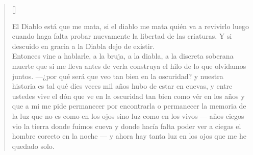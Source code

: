 \documentclass[11pt, a4paper]{article} %
\newcommand{\poemauthorright}[1]{\nopagebreak{\raggedleft\footnotesize\textsc{#1}\par}} %
\begin{document}

\settowidth{\versewidth}{Quiere mi tiempo libre la sutil, flexible dicha de buscarla, ------------------------------------------------------------------} %

\begin{verse}[\versewidth]
{\large

\scriptsize{
El Diablo está que me mata, si el diablo me mata quién va a revivirlo luego cuando
haga falta probar nuevamente la libertad de las criaturas. Y si descuido en gracia a 
la Diabla dejo de existir. \\
Entonces vine a hablarle, a la bruja, a la diabla, a la discreta soberana muerte 
que si me lleva antes de verla construya el hilo de lo que olvidamos juntos. 
---¿por qué será que veo tan bien en la oscuridad? 
y nuestra historia es tal qué dies veces mil años hubo de estar en cuevas, 
y entre ustedes vive el dón que ve en la oscuridad tan bien como vér en los años 
y que a mi me pide permanecer por encontrarla o permanecer la memoria de la luz 
que no es como en los ojos sino luz como en los vivos ---
años ciegos vio la tierra donde fuimos cueva y donde hacía falta 
poder ver a ciegas el hombre corecto en la noche ---
y ahora hay tanta luz en los ojos que me he quedado solo. 
}



}
\end{verse}


\poemauthorright{waajacu} %

\end{document}
